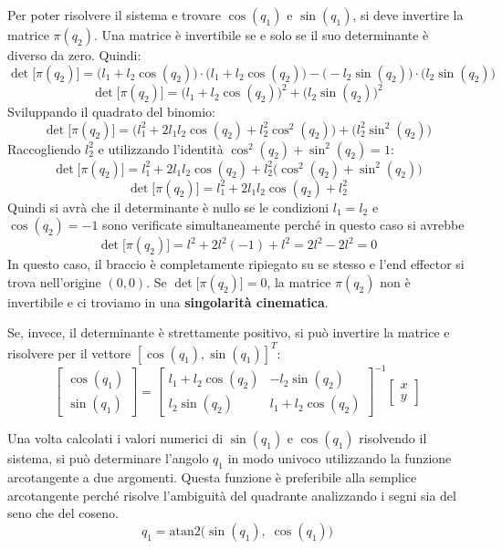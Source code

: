﻿\documentclass[11pt, a4paper]{article}
\begin{document}
Per poter risolvere il sistema e trovare $\cos(q_1)$ e $\sin(q_1)$, si deve invertire la matrice $\pi(q_2)$. Una matrice è invertibile se e solo se il suo determinante è diverso da zero. Quindi:
\[
    \det\bigl[ \pi(q_{2}) \bigr] =  \bigl( l_1 + l_2 \cos(q_2) \bigr) \cdot \bigl( l_1 + l_2 \cos(q_2) \bigr) - \bigl( -l_2 \sin(q_2) \bigr) \cdot \bigl( l_2 \sin(q_2) \bigr)
\]
\[
    \det\bigl[ \pi(q_{2}) \bigr] =  \bigl( l_1 + l_2 \cos(q_2) \bigr)^2 + \bigl( l_2 \sin(q_2) \bigr)^2
\]
Sviluppando il quadrato del binomio:
\[
    \det\bigl[ \pi(q_{2}) \bigr] =  \biggl( l_{1}^{2} + 2 l_{1} l_{2} \cos(q_{2}) + l_{2}^{2} \cos^{2}(q_{2}) \biggr) + \biggl( l_{2}^{2} \sin^{2}(q_{2}) \biggr)
\]
Raccogliendo $l_2^2$ e utilizzando l'identità $\cos^2(q_2) + \sin^2(q_2) = 1$:
\[
    \det\bigl[ \pi(q_{2}) \bigr] = l_{1}^{2} + 2 l_{1} l_{2} \cos(q_{2}) + l_{2}^{2} \bigl(\cos^{2}(q_{2}) + \sin^{2}(q_{2})\bigr)
\]
\[
    \det\bigl[ \pi(q_{2}) \bigr] = l_{1}^{2} + 2 l_{1} l_{2} \cos(q_{2}) + l_{2}^{2}
\]
Quindi si avrà che il determinante è nullo se le condizioni $l_1 = l_2$ e $\cos(q_2) = -1$ sono verificate simultaneamente perché in questo caso si avrebbe
\[
    \det\bigl[ \pi(q_{2}) \bigr] = l^{2} + 2 l^{2} (-1) + l^{2} = 2l^{2} - 2l^{2} = 0
\]
In questo caso, il braccio è completamente ripiegato su se stesso e l'end effector si trova nell'origine $(0,0)$.
Se $ \det\bigl[ \pi(q_{2}) \bigr] = 0 $, la matrice $\pi(q_2)$ non è invertibile e ci troviamo in una \textbf{singolarità cinematica}.

Se, invece, il determinante è strettamente positivo, si può invertire la matrice e risolvere per il vettore $[\cos(q_1), \sin(q_1)]^T$:
\[
    \begin{bmatrix}
        \cos(q_1)\\
        \sin(q_1)
    \end{bmatrix}
    =
    \begin{bmatrix}
        l_1 + l_2\cos(q_{2}) & - l_2\sin(q_{2})\\
        l_2\sin(q_{2}) & l_1 + l_2\cos(q_{2})
    \end{bmatrix}^{-1}
    \begin{bmatrix}
        x\\
        y
    \end{bmatrix}
\]

Una volta calcolati i valori numerici di $\sin(q_1)$ e $\cos(q_1)$ risolvendo il sistema, si può determinare l'angolo $q_1$ in modo univoco utilizzando la funzione arcotangente a due argomenti. Questa funzione è preferibile alla semplice arcotangente perché risolve l'ambiguità del quadrante analizzando i segni sia del seno che del coseno.
\[
    \boxed{q_{1} = \text{atan2} \biggl(\sin(q_{1}), \; \cos(q_{1}) \biggr)}
\]
\end{document}
